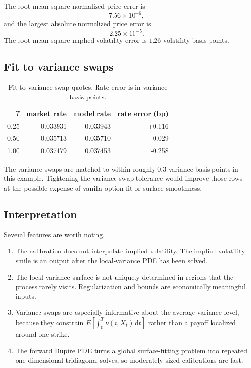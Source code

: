 \documentclass[11pt]{article}
\newcommand{\1}{\mathbf{1}}
\newcommand{\dd}{\,\mathrm{d}}
\newcommand{\vloc}{\nu}
\begin{document}
The root-mean-square normalized price error is
\[
  7.56\times10^{-6},
\]
and the largest absolute normalized price error is
\[
  2.25\times10^{-5}.
\]
The root-mean-square implied-volatility error is $1.26$ volatility basis points.

\subsection{Fit to variance swaps}

\begin{table}[h!]
\centering
\caption{Fit to variance-swap quotes. Rate error is in variance basis points.}
\begin{tabular}{rrrr}
\toprule
$T$ & market rate & model rate & rate error (bp)\\
\midrule
0.25 & 0.033931 & 0.033943 & +0.116\\
0.50 & 0.035713 & 0.035710 & -0.029\\
1.00 & 0.037479 & 0.037453 & -0.258\\
\bottomrule
\end{tabular}
\label{tab:fit_var}
\end{table}

The variance swaps are matched to within roughly $0.3$ variance basis points in this
example. Tightening the variance-swap tolerance would improve those rows at the possible
expense of vanilla option fit or surface smoothness.

\subsection{Interpretation}

Several features are worth noting.

\begin{enumerate}[leftmargin=0.9cm]
\item The calibration does not interpolate implied volatility. The implied-volatility
      smile is an output after the local-variance PDE has been solved.
\item The local-variance surface is not uniquely determined in regions that the process
      rarely visits. Regularization and bounds are economically meaningful inputs.
\item Variance swaps are especially informative about the average variance level, because
      they constrain $E[\int_0^T\vloc(t,X_t)\dd t]$ rather than a payoff localized around
      one strike.
\item The forward Dupire PDE turns a global surface-fitting problem into repeated
      one-dimensional tridiagonal solves, so moderately sized calibrations are fast.
\end{enumerate}
\end{document}
